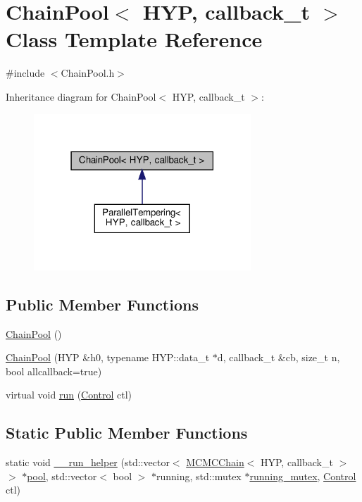 \hypertarget{class_chain_pool}{}\section{Chain\+Pool$<$ H\+YP, callback\+\_\+t $>$ Class Template Reference}
\label{class_chain_pool}


{\ttfamily \#include $<$Chain\+Pool.\+h$>$}



Inheritance diagram for Chain\+Pool$<$ H\+YP, callback\+\_\+t $>$\+:\nopagebreak
\begin{figure}[H]
\begin{center}
\leavevmode
\includegraphics[width=231pt]{class_chain_pool__inherit__graph}
\end{center}
\end{figure}
\subsection*{Public Member Functions}
\begin{DoxyCompactItemize}
\item 
\hyperlink{class_chain_pool_ae8795a9a7c0fff45c82334fa821c8c3c}{Chain\+Pool} ()
\item 
\hyperlink{class_chain_pool_a7794efde5588ecbf3603170d6226cd6f}{Chain\+Pool} (H\+YP \&h0, typename H\+Y\+P\+::data\+\_\+t $\ast$d, callback\+\_\+t \&cb, size\+\_\+t n, bool allcallback=true)
\item 
virtual void \hyperlink{class_chain_pool_af5f0e391f9794ff89f29296c8b41bf8e}{run} (\hyperlink{struct_control}{Control} ctl)
\end{DoxyCompactItemize}
\subsection*{Static Public Member Functions}
\begin{DoxyCompactItemize}
\item 
static void \hyperlink{class_chain_pool_a7df513bcd7b99c2fa99a9cfdd238817b}{\+\_\+\+\_\+run\+\_\+helper} (std\+::vector$<$ \hyperlink{class_m_c_m_c_chain}{M\+C\+M\+C\+Chain}$<$ H\+YP, callback\+\_\+t $>$$>$ $\ast$\hyperlink{class_chain_pool_af89400f6e9a2312fe2ee7873745a6e91}{pool}, std\+::vector$<$ bool $>$ $\ast$running, std\+::mutex $\ast$\hyperlink{class_chain_pool_a6efe006156a22132b452d50dab9f76c0}{running\+\_\+mutex}, \hyperlink{struct_control}{Control} ctl)
\end{DoxyCompactItemize}
